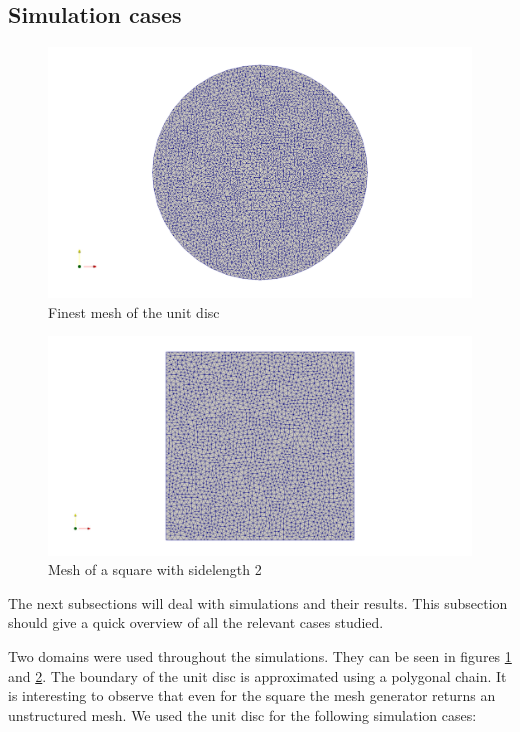 \documentclass[12pt,a4paper,twoside, open=right]{scrreprt}
\theoremstyle{definition}
\theoremstyle{plain}
\begin{document}
\subsection{Simulation cases}
\begin{figure}
    \includegraphics[width=\textwidth]{meshcircle}
    \caption{Finest mesh of the unit disc}
    \label{fig:mesh}
\end{figure}
\begin{figure}
    \includegraphics[width=\textwidth]{meshsquare}
    \caption{Mesh of a square with sidelength 2}
    \label{fig:meshsquare}
\end{figure}
The next subsections will deal with simulations and their results. This subsection should give a quick overview of all the relevant cases studied. \par
Two domains were used throughout the simulations. They can be seen in figures \ref{fig:mesh} and \ref{fig:meshsquare}. The boundary of the unit disc is approximated using a polygonal chain. It is interesting to observe that even for the square the mesh generator returns an unstructured mesh.
We used the unit disc for the following simulation cases:
\end{document}

